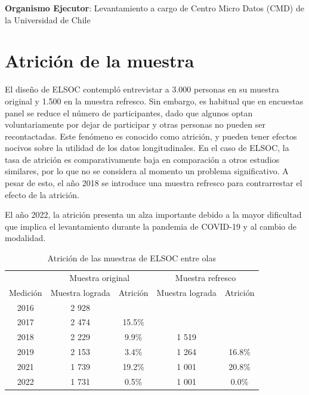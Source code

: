\documentclass[
  12pt,
]{book}
\begin{document}
\textbf{Organismo Ejecutor}: Levantamiento a cargo de Centro Micro Datos (CMD) de la Universidad de Chile

\hypertarget{atriciuxf3n-de-la-muestra}{%
\section{Atrición de la muestra}\label{atriciuxf3n-de-la-muestra}}

El diseño de ELSOC contempló entrevistar a 3.000 personas en su muestra original y 1.500 en la muestra refresco. Sin embargo, es habitual que en encuestas panel se reduce el número de participantes, dado que algunos optan voluntariamente por dejar de participar y otras personas no pueden ser recontactadas. Este fenómeno es conocido como atrición, y pueden tener efectos nocivos sobre la utilidad de los datos longitudinales. En el caso de ELSOC, la tasa de atrición es comparativamente baja en comparación a otros estudios similares, por lo que no se considera al momento un problema significativo. A pesar de esto, el año 2018 se introduce una muestra refresco para contrarrestar el efecto de la atrición.

El año 2022, la atrición presenta un alza importante debido a la mayor dificultad que implica el levantamiento durante la pandemia de COVID-19 y al cambio de modalidad.

\begin{table}

\caption{\label{tab:tabla-atricion}Atrición de las muestras de ELSOC entre olas}
\centering
\begin{tabular}[t]{c|c|c|c|c}
\hline
\multicolumn{1}{c|}{ } & \multicolumn{2}{c|}{Muestra original} & \multicolumn{2}{c}{Muestra refresco} \\
\cline{2-3} \cline{4-5}
Medición & Muestra lograda & Atrición & Muestra lograda & Atrición\\
\hline
2016 & 2 928 &  &  & \\
\hline
2017 & 2 474 & 15.5\% &  & \\
\hline
2018 & 2 229 & 9.9\% & 1 519 & \\
\hline
2019 & 2 153 & 3.4\% & 1 264 & 16.8\%\\
\hline
2021 & 1 739 & 19.2\% & 1 001 & 20.8\%\\
\hline
2022 & 1 731 & 0.5\% & 1 001 & 0.0\%\\
\hline
\end{tabular}
\end{table}
\end{document}
